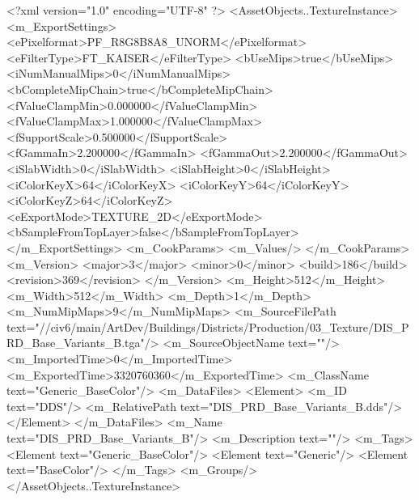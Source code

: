 <?xml version="1.0" encoding="UTF-8" ?>
<AssetObjects..TextureInstance>
	<m_ExportSettings>
		<ePixelformat>PF_R8G8B8A8_UNORM</ePixelformat>
		<eFilterType>FT_KAISER</eFilterType>
		<bUseMips>true</bUseMips>
		<iNumManualMips>0</iNumManualMips>
		<bCompleteMipChain>true</bCompleteMipChain>
		<fValueClampMin>0.000000</fValueClampMin>
		<fValueClampMax>1.000000</fValueClampMax>
		<fSupportScale>0.500000</fSupportScale>
		<fGammaIn>2.200000</fGammaIn>
		<fGammaOut>2.200000</fGammaOut>
		<iSlabWidth>0</iSlabWidth>
		<iSlabHeight>0</iSlabHeight>
		<iColorKeyX>64</iColorKeyX>
		<iColorKeyY>64</iColorKeyY>
		<iColorKeyZ>64</iColorKeyZ>
		<eExportMode>TEXTURE_2D</eExportMode>
		<bSampleFromTopLayer>false</bSampleFromTopLayer>
	</m_ExportSettings>
	<m_CookParams>
		<m_Values/>
	</m_CookParams>
	<m_Version>
		<major>3</major>
		<minor>0</minor>
		<build>186</build>
		<revision>369</revision>
	</m_Version>
	<m_Height>512</m_Height>
	<m_Width>512</m_Width>
	<m_Depth>1</m_Depth>
	<m_NumMipMaps>9</m_NumMipMaps>
	<m_SourceFilePath text="//civ6/main/ArtDev/Buildings/Districts/Production/03_Texture/DIS_PRD_Base_Variants_B.tga"/>
	<m_SourceObjectName text=""/>
	<m_ImportedTime>0</m_ImportedTime>
	<m_ExportedTime>3320760360</m_ExportedTime>
	<m_ClassName text="Generic_BaseColor"/>
	<m_DataFiles>
		<Element>
			<m_ID text="DDS"/>
			<m_RelativePath text="DIS_PRD_Base_Variants_B.dds"/>
		</Element>
	</m_DataFiles>
	<m_Name text="DIS_PRD_Base_Variants_B"/>
	<m_Description text=""/>
	<m_Tags>
		<Element text="Generic_BaseColor"/>
		<Element text="Generic"/>
		<Element text="BaseColor"/>
	</m_Tags>
	<m_Groups/>
</AssetObjects..TextureInstance>

